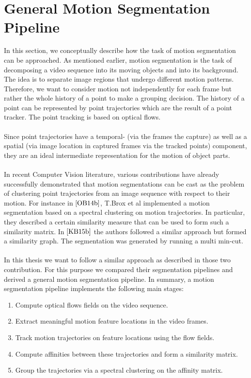 \section{General Motion Segmentation Pipeline}
In this section, we conceptually describe how the task of motion segmentation can be approached. As mentioned earlier, motion segmentation is the task of decomposing a video sequence into its moving objects and into its background. The idea is to separate image regions that undergo different motion patterns. Therefore, we want to consider motion not independently for each frame but rather the whole history of a point to make a grouping decision. The history of a point can be represented by point trajectories which are the result of a point tracker. The point tracking is based on optical flows. \\ \\
Since point trajectories have a temporal- (via the frames the capture) as well as a spatial (via image location in captured frames via the tracked points) component, they are an ideal intermediate representation for the motion of object parts. \\ \\
In recent Computer Vision literature, various contributions have already successfully demonstrated that motion segmentations can be cast as the problem of clustering point trajectories from an image sequence with respect to their motion. For instance in $\cite{OB14b}$, T.Brox et al implemented a motion segmentation based on a spectral clustering on motion trajectories. In particular, they described a certain similarity measure that can be used to form such a similarity matrix. In $\cite{KB15b}$ the authors followed a similar approach but formed a similarity graph. The segmentation was generated by running a multi min-cut. \\ \\
In this thesis we want to follow a similar approach as described in those two contribution. For this purpose we compared their segmentation pipelines and derived a general motion segmentation pipeline. In summary, a motion segmentation pipeline implements the following main stages:
\begin{enumerate}
	\item Compute optical flows fields on the video sequence.
	\item Extract meaningful motion feature locations in the video frames.
	\item Track motion trajectories on feature locations using the flow fields.
	\item Compute affinities between these trajectories and form a similarity matrix.
	\item Group the trajectories via a spectral clustering on the affinity matrix.
\end{enumerate}
